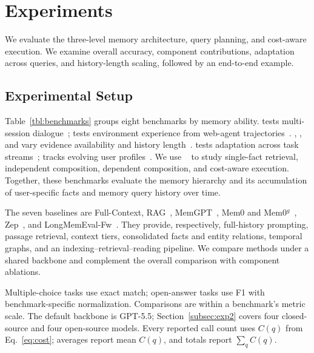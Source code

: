 \section{Experiments}
\label{sec:experiments}

We evaluate the three-level memory architecture, query planning, and
cost-aware execution. We examine overall
accuracy, component contributions, adaptation across queries, and
history-length scaling, followed by an end-to-end example.

\subsection{Experimental Setup}
\label{subsec:setup}



Table~\ref{tbl:benchmarks} groups eight benchmarks by memory ability.
\locomo{} tests multi-session dialogue~\cite{locomo}; \lmev{} tests
environment experience from web-agent trajectories~\cite{longmemevalv2}.
\lmeo{}, \lmes{}, and \lmem{} vary evidence availability and history
length~\cite{longmemeval}. \evomem{} tests adaptation across task
streams~\cite{evomemory}; \dynamicmem{} tracks evolving user
profiles~\cite{dynamicmem}.
We use \membench{}~\cite{membench} to study single-fact retrieval,
independent composition, dependent composition, and cost-aware
execution. Together, these benchmarks evaluate the memory hierarchy and its
accumulation of user-specific facts and memory query history over time.

The seven baselines are Full-Context,
RAG~\cite{rag}, MemGPT~\cite{memgpt}, Mem0 and
Mem0$^{g}$~\cite{mem0}, Zep~\cite{zep}, and
LongMemEval-Fw~\cite{longmemeval}. They provide, respectively,
full-history prompting, passage retrieval, context tiers,
consolidated facts and entity relations, temporal graphs, and an
indexing--retrieval--reading pipeline.
We compare methods under a shared backbone and complement the overall
comparison with component ablations.

Multiple-choice tasks use exact match; open-answer tasks use F1 with
benchmark-specific normalization. Comparisons are within a benchmark's
metric scale.
The default backbone is GPT-5.5; Section~\ref{subsec:exp2} covers four closed-source and
four open-source models. Every reported call count uses $C(q)$ from
Eq.~\eqref{eq:cost}; averages report mean $C(q)$, and totals report
$\sum_q C(q)$.

